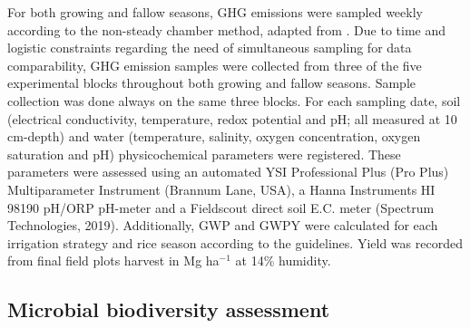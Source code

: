For both growing and fallow seasons, GHG emissions were sampled weekly according to the non-steady chamber method, adapted from \cite{martinez2018neglecting}. Due to time and logistic constraints regarding the need of simultaneous sampling for data comparability, GHG emission samples were collected from three of the five experimental blocks throughout both growing and fallow seasons. Sample collection was done always on the same three blocks. 
For each sampling date, soil (electrical conductivity, temperature, redox potential and pH; all measured at 10 cm-depth) and water (temperature, salinity, oxygen concentration, oxygen saturation and pH) physicochemical parameters were registered. These parameters were assessed using an automated YSI Professional Plus (Pro Plus) Multiparameter Instrument (Brannum Lane, USA), a Hanna Instruments HI 98190 pH/ORP pH-meter and a Fieldscout direct soil E.C. meter (Spectrum Technologies, 2019). Additionally, GWP and GWPY were calculated for each irrigation strategy and rice season according to the \cite{IPCC2021} guidelines. Yield was recorded from final field plots harvest in Mg ha$^{-1}$ at 14\% humidity.\\

\subsection{Microbial biodiversity assessment}
\label{sec:meth_BIO}

